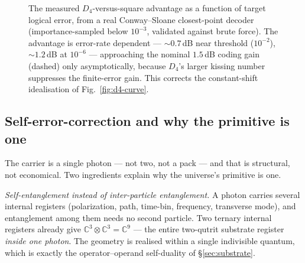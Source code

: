 \documentclass[11pt]{article}
\begin{document}
\begin{figure}[ht]\centering
{}
\caption{The measured $D_4$-versus-square advantage as a function of target logical
error, from a real Conway--Sloane closest-point decoder (importance-sampled below
$10^{-3}$, validated against brute force). The advantage is error-rate dependent ---
$\sim0.7$\,dB near threshold ($10^{-2}$), $\sim1.2$\,dB at $10^{-6}$ --- approaching
the nominal $1.5$\,dB coding gain (dashed) only asymptotically, because $D_4$'s larger
kissing number suppresses the finite-error gain. This corrects the constant-shift
idealisation of Fig.~\ref{fig:d4-curve}.}
\label{fig:d4-advantage}
\end{figure}

\subsection{Self-error-correction and why the primitive is one}

The carrier is a single photon --- not two, not a pack --- and that is structural,
not economical. Two ingredients explain why the universe's primitive is one.

\emph{Self-entanglement instead of inter-particle entanglement.} A photon carries
several internal registers (polarization, path, time-bin, frequency, transverse
mode), and entanglement among them needs no second particle. Two ternary internal
registers already give $\mathbb C^3\otimes\mathbb C^3=\mathbb C^9$ --- the entire
two-qutrit substrate register \emph{inside one photon}. The geometry is realised
within a single indivisible quantum, which is exactly the operator--operand
self-duality of \S\ref{sec:substrate}.
\end{document}
